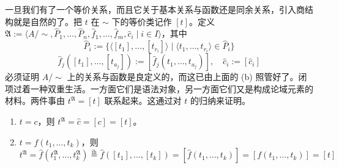 \documentclass[12pt, a4paper]{article}
\begin{document}
一旦我们有了一个等价关系，而且它关于基本关系与函数还是同余关系，引入商结构就是自然的了。把 \(t\) 在 \(\sim\) 下的等价类记作 \([t]\)。定义 \(\mathfrak{A} := \langle A/{\sim}, \hat{P}_1, \dots, \hat{P}_n, \hat{f}_1, \dots, \hat{f}_m, \hat{c}_i \mid i \in I \rangle\)，其中
\[
\hat{P}_i := \{\langle [t_1], \dots, [t_{r_i}] \rangle \mid \langle t_1, \dots, t_{r_i} \rangle \in \hat{P}_i\}
\]
\[
\hat{f}_j([t_1], \dots, [t_{a_j}]) := [\hat{f}_j(t_1, \dots, t_{a_j})], \quad \hat{c}_i := [\hat{c}_i]
\]
必须证明 \(A/{\sim}\) 上的关系与函数是良定义的，而这已由上面的 (b) 照管好了。闭项过着一种双重生活。一方面它们是语法对象，另一方面它们又是构成论域元素的材料。两件事由 \(t^{\mathfrak{A}} = [t]\) 联系起来。这通过对 \(t\) 的归纳来证明。
\begin{enumerate}
    \item[(i)] \(t = c\)，则 \(t^{\mathfrak{A}} = \hat{c} = [c] = [t]\)。
    \item[(ii)] \(t = f(t_1, \dots, t_k)\)，则
    \[
    t^{\mathfrak{A}} = \hat{f}(t_1^{\mathfrak{A}}, \dots, t_k^{\mathfrak{A}}) \stackrel{\text{ih}}{=} \hat{f}([t_1], \dots, [t_k]) = [\hat{f}(t_1, \dots, t_k)] = [f(t_1, \dots, t_k)] = [t]
    \]
\end{enumerate}
\end{document}
